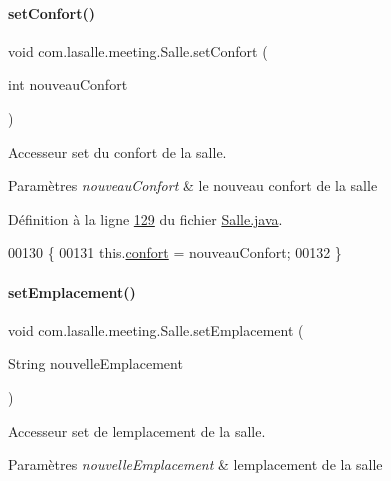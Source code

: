 \paragraph{\texorpdfstring{set\+Confort()}{setConfort()}}
{\footnotesize\ttfamily void com.\+lasalle.\+meeting.\+Salle.\+set\+Confort (\begin{DoxyParamCaption}\item[{int}]{nouveau\+Confort }\end{DoxyParamCaption})}



Accesseur set du confort de la salle. 


\begin{DoxyParams}{Paramètres}
{\em nouveau\+Confort} & le nouveau confort de la salle \\
\hline
\end{DoxyParams}


Définition à la ligne \hyperlink{_salle_8java_source_l00129}{129} du fichier \hyperlink{_salle_8java_source}{Salle.\+java}.


\begin{DoxyCode}
00130     \{
00131         this.\hyperlink{classcom_1_1lasalle_1_1meeting_1_1_salle_ac165425fc78429c38042a0fed650b9ee}{confort} = nouveauConfort;
00132     \}
\end{DoxyCode}
\mbox{\label{classcom_1_1lasalle_1_1meeting_1_1_salle_aaa826cdcf54f561daf439c2bf84de5eb}} 
\paragraph{\texorpdfstring{set\+Emplacement()}{setEmplacement()}}
{\footnotesize\ttfamily void com.\+lasalle.\+meeting.\+Salle.\+set\+Emplacement (\begin{DoxyParamCaption}\item[{String}]{nouvelle\+Emplacement }\end{DoxyParamCaption})}



Accesseur set de l\textquotesingle{}emplacement de la salle. 


\begin{DoxyParams}{Paramètres}
{\em nouvelle\+Emplacement} & l\textquotesingle{}emplacement de la salle \\
\hline
\end{DoxyParams}


